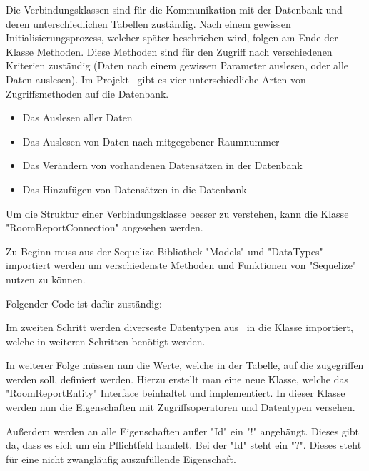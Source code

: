 
Die Verbindungsklassen sind für die Kommunikation mit der Datenbank und deren unterschiedlichen Tabellen zuständig. Nach einem gewissen Initialisierungsprozess, welcher später beschrieben wird, folgen am Ende der Klasse Methoden. Diese Methoden sind für den Zugriff nach verschiedenen Kriterien zuständig (Daten nach einem gewissen Parameter auslesen, oder alle Daten auslesen). Im Projekt \ZELIA\ gibt es vier unterschiedliche Arten von Zugriffsmethoden auf die Datenbank.

\begin{itemize}
    \item Das Auslesen aller Daten
    \item Das Auslesen von Daten nach mitgegebener Raumnummer
    \item Das Verändern von vorhandenen Datensätzen in der Datenbank
    \item Das Hinzufügen von Datensätzen in die Datenbank
\end{itemize}

Um die Struktur einer Verbindungsklasse besser zu verstehen, kann die Klasse "RoomReportConnection" angesehen werden.

Zu Beginn muss aus der Sequelize-Bibliothek "Models" und "DataTypes" importiert werden um verschiedenste Methoden und Funktionen von "Sequelize" nutzen zu können. 

Folgender Code ist dafür zuständig:


Im zweiten Schritt werden diverseste Datentypen aus \ZELIA\ in die Klasse importiert, welche in weiteren Schritten benötigt werden.

In weiterer Folge müssen nun die Werte, welche in der Tabelle, auf die zugegriffen werden soll, definiert werden. Hierzu erstellt man eine neue Klasse, welche das "RoomReportEntity" Interface beinhaltet und implementiert. In dieser Klasse werden nun die Eigenschaften mit Zugriffsoperatoren und Datentypen versehen. 

Außerdem werden an alle Eigenschaften außer "Id" ein "!" angehängt. Dieses gibt da, dass es sich um ein Pflichtfeld handelt. Bei der "Id" steht ein "?". Dieses steht für eine nicht zwangläufig auszufüllende Eigenschaft.


